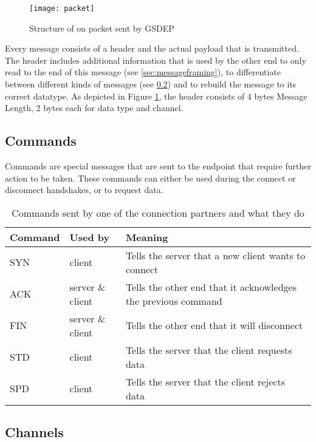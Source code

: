 \begin{figure}[H]
	\centering
	\texttt{[image: packet]}
	\caption{Structure of on packet sent by GSDEP}
	\label{fig:packet}
\end{figure}

Every message consists of a header and the actual payload that is transmitted. The header includes additional information that is used by the other end to only read to the end of this message (see \ref{sec:messageframing}), to differentiate between different kinds of messages (see \ref{sec:channels}) and to rebuild the message to its correct datatype. As depicted in Figure \ref{fig:packet}, the header consists of 4 bytes Message Length, 2 bytes each for data type and channel.

\subsection{Commands}

Commands are special messages that are sent to the endpoint that require further action to be taken. These commands can either be used during the connect or disconnect handshakes, or to request data.

\begin{table}[H]
	\centering
	\begin{tabular}{| l | l | p{5cm} |}
	\hline
	\textbf{Command} & \textbf{Used by} & \textbf{Meaning} \\ \hline
	SYN & client & Tells the server that a new client wants to connect \\ \hline
	ACK & server \& client & Tells the other end that it acknowledges the previous command \\ \hline
	FIN & server \& client & Tells the other end that it will disconnect \\ \hline
	STD & client & Tells the server that the client requests data\\ \hline
	SPD & client & Tells the server that the client rejects data\\
	\hline
	\end{tabular}
	\caption{Commands sent by one of the connection partners and what they do}
	\label{tab:commands}
\end{table}

\subsection{Channels}
\label{sec:channels}

